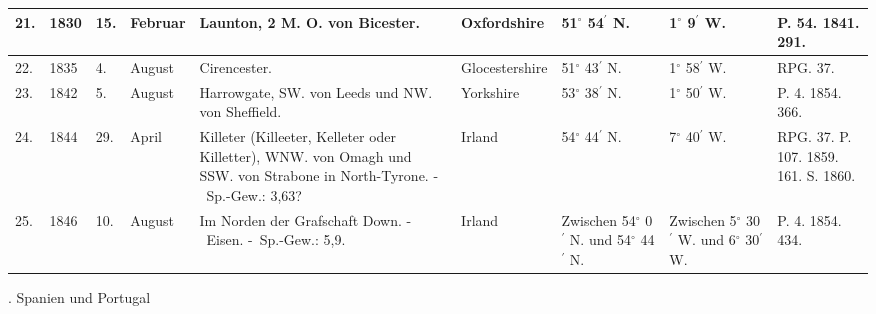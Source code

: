 \documentclass[a4paper, 11pt, oneside, polutonikogreek, german]{article}
\begin{document}
\begin{table}[!ht]
\begin{tabular}{|l|l|l|l|l|l|l|l|l|}
        21. & 1830 & 15. & Februar & Launton, 2 M. O. von Bicester. & Oxfordshire & 51$^\circ$ 54$^\prime$ N. & 1$^\circ$ 9$^\prime$ W. & P. 54. 1841. 291. \\ \hline
        22. & 1835 & 4. & August & Cirencester. & Glocestershire & 51$^\circ$ 43$^\prime$ N. & 1$^\circ$ 58$^\prime$ W. & RPG. 37. \\ \hline
        23. & 1842 & 5. & August & Harrowgate, SW. von Leeds und NW. von Sheffield. & Yorkshire & 53$^\circ$ 38$^\prime$ N. & 1$^\circ$ 50$^\prime$ W. & P. 4. 1854. 366. \\ \hline
        24. & 1844 & 29. & April & Killeter (Killeeter, Kelleter oder Killetter), WNW. von Omagh und SSW. von Strabone in North-Tyrone. - Sp.-Gew.: 3,63? & Irland & 54$^\circ$ 44$^\prime$ N. & 7$^\circ$ 40$^\prime$ W. & RPG. 37. P. 107. 1859. 161. S. 1860. \\ \hline
        25. & 1846 & 10. & August & Im Norden der Grafschaft Down. - Eisen. - Sp.-Gew.: 5,9. & Irland & Zwischen 54$^\circ$ 0$^\prime$ N. und 54$^\circ$ 44$^\prime$ N. & Zwischen 5$^\circ$ 30$^\prime$ W. und 6$^\circ$ 30$^\prime$ W. & P. 4. 1854. 434. \\ \hline
    \end{tabular}
\end{table}
. Spanien und Portugal
\end{document}
